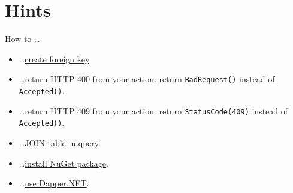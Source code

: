 \documentclass[12pt]{article}
\newcommand{\code}[1]{\texttt{#1}}
\begin{document}
\section*{Hints}
How to \dots
\begin{itemize}
\item \dots \href{https://dev.mysql.com/doc/refman/5.6/en/create-table-foreign-keys.html}{create foreign key}.
\item \dots return HTTP 400 from your action: return \code{BadRequest()} instead of \code{Accepted()}.
\item \dots return HTTP 409 from your action: return \code{StatusCode(409)} instead of \code{Accepted()}.
\item \dots \href{https://dev.mysql.com/doc/refman/5.7/en/join.html}{JOIN table in query}.
\item \dots \href{https://www.jetbrains.com/help/rider/Using_NuGet.html}{install NuGet package}.
\item \dots \href{https://github.com/StackExchange/Dapper}{use Dapper.NET}.
\end{itemize}
\end{document}
